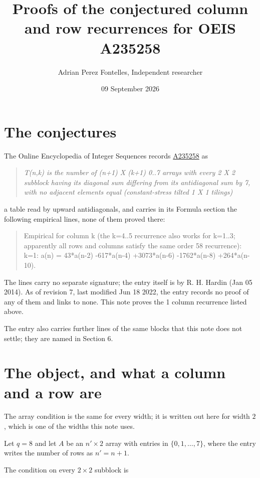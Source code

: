 \documentclass[11pt]{article}
\title{Proofs of the conjectured column and row recurrences for OEIS A235258}
\author{Adrian Perez Fontelles, Independent researcher}
\date{09 September 2026}
\theoremstyle{definition}
\begin{document}
\maketitle
\section{The conjectures}

The Online Encyclopedia of Integer Sequences records \href{https://oeis.org/A235258}{A235258} as

\begin{quote}\itshape T(n,k) is the number of (n+1) X (k+1) 0..7 arrays with every 2 X 2 subblock having its diagonal sum differing from its antidiagonal sum by 7, with no adjacent elements equal (constant-stress tilted 1 X 1 tilings)\end{quote}

a table read by upward antidiagonals, and carries in its Formula section the following empirical lines, none of them proved there:

\begin{quote}\ttfamily Empirical for column k (the k=4..5 recurrence also works for k=1..3; apparently all rows and columns satisfy the same order 58 recurrence):\\
k=1: a(n) = 43*a(n-2) -617*a(n-4) +3073*a(n-6) -1762*a(n-8) +264*a(n-10).\end{quote}

The lines carry no separate signature; the entry itself is by R. H. Hardin (Jan 05 2014). As of revision 7, last modified Jun 18 2022, the entry records no proof of any of them and links to none. This note proves the 1 column recurrence listed above.

The entry also carries further lines of the same blocks that this note does not settle; they are named in Section 6.

\section{The object, and what a column and a row are}

The array condition is the same for every width; it is written out here for width $2$, which is one of the widths this note uses.

Let $q = 8$ and let $A$ be an $n' \times 2$ array with entries in $\{0,1,\dots,7\}$, where the entry writes the number of rows as $n' = n + 1$.

The condition on every $2 \times 2$ subblock is
\end{document}
